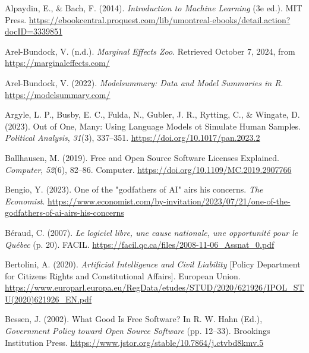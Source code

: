 \documentclass[
  letterpaper,
  DIV=11,
  numbers=noendperiod]{scrreprt}
\newlength{\cslhangindent}
\newlength{\cslentryspacingunit} %
\newenvironment{CSLReferences}[2] %
 {%
  \setlength{\parindent}{0pt}
  \ifodd #1
  \let\oldpar\par
  \def\par{\hangindent=\cslhangindent\oldpar}
  \fi
  \setlength{\parskip}{#2\cslentryspacingunit}
 }%
 {}
\begin{document}

\hypertarget{refs}{}
\begin{CSLReferences}{1}{0}
\leavevmode{}%
Alpaydin, E., \& Bach, F. (2014). \emph{Introduction to {Machine
Learning}} (3e ed.). MIT Press.
\url{https://ebookcentral.proquest.com/lib/umontreal-ebooks/detail.action?docID=3339851}

\leavevmode{}%
Arel-Bundock, V. (n.d.). \emph{Marginal {Effects Zoo}}. Retrieved
October 7, 2024, from \url{https://marginaleffects.com/}

\leavevmode{}%
Arel-Bundock, V. (2022). \emph{Modelsummary: {Data} and {Model
Summaries} in {R}}. \url{https://modelsummary.com/}

\leavevmode{}%
Argyle, L. P., Busby, E. C., Fulda, N., Gubler, J. R., Rytting, C., \&
Wingate, D. (2023). Out of {One}, {Many}: {Using Language Models} ot
{Simulate Human Samples}. \emph{Political Analysis}, \emph{31}(3),
337--351. \url{https://doi.org/10.1017/pan.2023.2}

\leavevmode{}%
Ballhausen, M. (2019). Free and {Open Source Software Licenses
Explained}. \emph{Computer}, \emph{52}(6), 82--86. Computer.
\url{https://doi.org/10.1109/MC.2019.2907766}

\leavevmode{}%
Bengio, Y. (2023). One of the "godfathers of {AI}" airs his concerns.
\emph{The Economist}.
\url{https://www.economist.com/by-invitation/2023/07/21/one-of-the-godfathers-of-ai-airs-his-concerns}

\leavevmode{}%
Béraud, C. (2007). \emph{Le logiciel libre, une cause nationale, une
opportunité pour le {Québec}} (p. 20). FACIL.
\url{https://facil.qc.ca/files/2008-11-06_Assnat_0.pdf}

\leavevmode{}%
Bertolini, A. (2020). \emph{Artificial {Intelligence} and {Civil
Liability}} {[}Policy Department for Citizen\textquotesingle s Rights
and Constitutional Affairs{]}. European Union.
\url{https://www.europarl.europa.eu/RegData/etudes/STUD/2020/621926/IPOL_STU(2020)621926_EN.pdf}

\leavevmode{}%
Bessen, J. (2002). What {Good Is Free Software}? In R. W. Hahn (Ed.),
\emph{Government {Policy} toward {Open Source Software}} (pp. 12--33).
Brookings Institution Press.
\url{https://www.jstor.org/stable/10.7864/j.ctvbd8kmv.5}


\end{CSLReferences}
\end{document}
